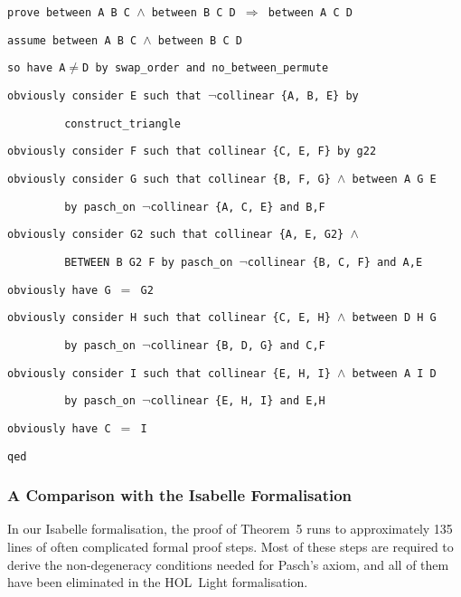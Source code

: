 \vspace{0.5cm}
\begin{minipage}{\linewidth}
  \footnotesize 
  \texttt{prove between A B C $\wedge$ between B C D $\Longrightarrow$ between A C D}

  \texttt{assume between A B C $\wedge$ between B C D}

  \texttt{so have A$\neq$D by swap\_order and no\_between\_permute}

  \texttt{obviously consider E such that $\neg$collinear \{A, B, E\} by}

  \texttt{$\qquad\qquad$ construct\_triangle}

  \texttt{obviously consider F such that collinear \{C, E, F\} by g22}

  \texttt{obviously consider G such that collinear \{B, F, G\} $\wedge$ between A G E}

  \texttt{$\qquad\qquad$ by pasch\_on $\neg$collinear \{A, C, E\} and B,F}

  \texttt{obviously consider G2 such that collinear \{A, E, G2\} $\wedge$}

  \texttt{$\qquad\qquad$ BETWEEN B G2 F by pasch\_on $\neg$collinear \{B, C, F\} and A,E}

  \texttt{obviously have G $=$ G2}

  \texttt{obviously consider H such that collinear \{C, E, H\} $\wedge$ between D H G}

  \texttt{$\qquad\qquad$ by pasch\_on $\neg$collinear \{B, D, G\} and C,F}

  \texttt{obviously consider I such that collinear \{E, H, I\} $\wedge$ between A I D}

  \texttt{$\qquad\qquad$ by pasch\_on $\neg$collinear \{E, H, I\} and E,H}

  \texttt{obviously have C $=$ I}

  \texttt{qed}
\end{minipage}
\vspace{0.5cm}

\subsubsection{A Comparison with the Isabelle Formalisation}
In our Isabelle formalisation, the proof of Theorem~5 runs to approximately 135 lines of often complicated formal proof steps. Most of these steps are required to derive the non-degeneracy conditions needed for Pasch's axiom, and all of them have been eliminated in the HOL~Light formalisation. 

